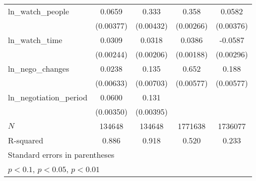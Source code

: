 {\begin{tabular}{l*{4}{c}}
ln\_watch\_people&      0.0659\sym{***}&       0.333\sym{***}&       0.358\sym{***}&      0.0582\sym{***}\\
            &   (0.00377)         &   (0.00432)         &   (0.00266)         &   (0.00376)         \\
\addlinespace
ln\_watch\_time&      0.0309\sym{***}&      0.0318\sym{***}&      0.0386\sym{***}&     -0.0587\sym{***}\\
            &   (0.00244)         &   (0.00206)         &   (0.00188)         &   (0.00296)         \\
\addlinespace
ln\_nego\_changes&      0.0238\sym{***}&       0.135\sym{***}&       0.652\sym{***}&       0.188\sym{***}\\
            &   (0.00633)         &   (0.00703)         &   (0.00577)         &   (0.00577)         \\
\addlinespace
ln\_negotiation\_period&      0.0600\sym{***}&       0.131\sym{***}&                     &                     \\
            &   (0.00350)         &   (0.00395)         &                     &                     \\
\midrule
\(N\)       &      134648         &      134648         &     1771638         &     1736077         \\
R-squared   &       0.886         &       0.918         &       0.520         &       0.233         \\
\bottomrule
\multicolumn{5}{l}{\footnotesize Standard errors in parentheses}\\
\multicolumn{5}{l}{\footnotesize \sym{*} \(p<0.1\), \sym{**} \(p<0.05\), \sym{***} \(p<0.01\)}\\
\end{tabular}
}
